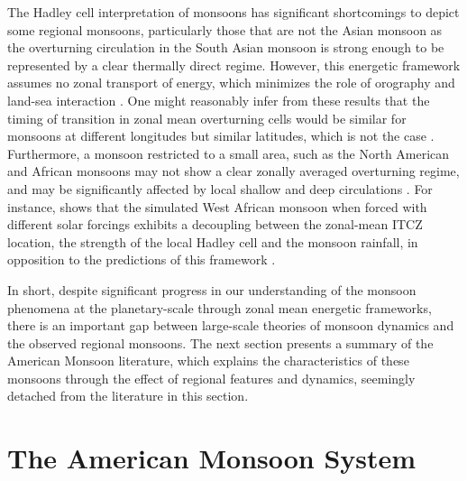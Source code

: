  
The Hadley cell interpretation of monsoons has significant shortcomings to depict some regional monsoons, particularly those that are not the Asian monsoon as the overturning circulation in the South Asian monsoon is strong enough to be represented by a clear thermally direct regime.
However, this energetic framework assumes no zonal transport of energy, which minimizes the role of orography and land-sea interaction \citep{biasutti2018global}.
One might reasonably infer from these results that the timing of transition in zonal mean overturning cells would be similar for monsoons at different longitudes but similar latitudes, which is not the case \citep{wang2017}.
Furthermore, a monsoon restricted to a small area, such as the North American and African monsoons may not show a clear zonally averaged overturning regime, and may be significantly affected by local shallow and deep circulations \citep{zhai2015regime}. For instance, \cite{smyth2018simulated} shows that the simulated West African monsoon when forced with different solar forcings exhibits a decoupling between the zonal-mean ITCZ location, the strength of the local Hadley cell and the monsoon rainfall, in opposition to the predictions of this framework \citep{bordoni2008monsoons}.


In short, despite significant progress in our understanding of the monsoon phenomena at the planetary-scale through zonal mean energetic frameworks, there is an important gap between large-scale theories of monsoon dynamics and the observed regional monsoons. 
The next section presents a summary of the American Monsoon literature, which explains the characteristics of these monsoons through the effect of regional features and dynamics, seemingly detached from the literature in this section.

\section{The American Monsoon System}\label{sq:bk_ams}

